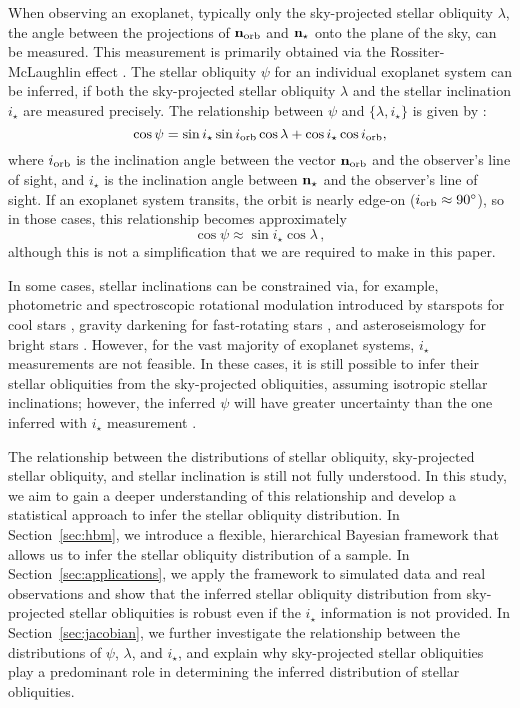 \documentclass[twocolumn,times]{aastex631}
\begin{document}
When observing an exoplanet, typically only the sky-projected stellar obliquity $\lambda$, the angle between the projections of $\bf{n}_{\rm orb}$ and $\bf{n}_{\star}$ onto the plane of the sky, can be measured. This measurement is primarily obtained via the Rossiter-McLaughlin effect \citep{Rossiter24, McLaughlin24}. The stellar obliquity $\psi$ for an individual exoplanet system can be inferred, if both the sky-projected stellar obliquity $\lambda$ and the stellar inclination $i_\star$ are measured precisely. The relationship between $\psi$ and $\{\lambda, i_\star\}$ is given by \citep[e.g.,][]{Fabrycky09}:
\begin{equation}\label{eqn:psi}
    \cos{\psi} = \sin{i_\star}\sin{i_{\rm orb}}\cos{\lambda} + \cos{i_\star}\cos{i_{\rm orb}},
\end{equation}
where $i_{\rm orb}$ is the inclination angle between the vector $\bf{n}_{\rm orb}$ and the observer's line of sight, and $i_\star$ is the inclination angle between $\bf{n}_{\star}$ and the observer's line of sight.
If an exoplanet system transits, the orbit is nearly edge-on ($i_{\rm orb} \approx 90\mbox{$^\circ$}$), so in those cases, this relationship becomes approximately
\begin{equation}
\cos{\psi} \approx \sin{i_\star}\cos{\lambda}\,,
\end{equation}
although this is not a simplification that we are required to make in this paper.

In some cases, stellar inclinations can be constrained via, for example, photometric and spectroscopic rotational modulation introduced by starspots for cool stars \citep[e.g.,][]{Masuda20, Albrecht21}, gravity darkening for fast-rotating stars \citep[e.g.,][]{Barnes09, Barnes11}, and asteroseismology for bright stars \citep[e.g.][]{Chaplin13}.
However, for the vast majority of exoplanet systems, $i_\star$ measurements are not feasible. In these cases, it is still possible to infer their stellar obliquities from the sky-projected obliquities, assuming isotropic stellar inclinations; however, the inferred $\psi$ will have greater uncertainty than the one inferred with $i_\star$ measurement \citep{Fabrycky09}.

The relationship between the distributions of stellar obliquity, sky-projected stellar obliquity, and stellar inclination is still not fully understood. In this study, we aim to gain a deeper understanding of this relationship and develop a statistical approach to infer the stellar obliquity distribution.
In Section~\ref{sec:hbm}, we introduce a flexible, hierarchical Bayesian framework that allows us to infer the stellar obliquity distribution of a sample.
In Section~\ref{sec:applications}, we apply the framework to simulated data and real observations and show that the inferred stellar obliquity distribution from sky-projected stellar obliquities is robust even if the $i_\star$ information is not provided.
In Section~\ref{sec:jacobian}, we further investigate the relationship between the distributions of $\psi$, $\lambda$, and $i_\star$, and explain why sky-projected stellar obliquities play a predominant role in determining the inferred distribution of stellar obliquities.
\end{document}
